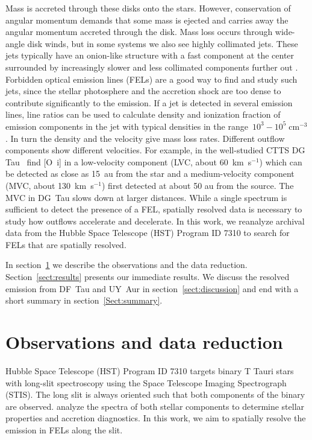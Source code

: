 \documentclass[twocolumn]{aastex62}
\begin{document}
Mass is accreted through these disks onto the stars. However,
conservation of angular momentum demands that some mass is ejected and
carries away the angular momentum accreted through
the disk. Mass
loss occurs through wide-angle disk winds, but in some systems we 
also see highly collimated jets. These jets typically have an onion-like
structure with a fast component at the center surrounded by increasingly
slower and less collimated components further
out \citep{2000ApJ...537L..49B}. Forbidden optical emission lines (FELs) are a
good way to find and study such jets, since the stellar photosphere and
the accretion shock are too dense to contribute significantly to the emission. If a
jet is detected in several emission lines, line ratios can be used to
calculate density and ionization fraction of emission components in the
jet with typical densities in the range~$10^3-10^5\;\mathrm{cm}^{-3}$
\citep[e.g.][]{1999A&A...342..717B,2000A&A...356L..41L,2013A&A...550L...1S}. In turn
the density and the velocity give mass loss rates. Different outflow
components show different velocities. For example, in the well-studied
CTTS DG Tau~\citet{2013A&A...550L...1S} find [O~{\sc i}] in a low-velocity
component (LVC, about 60~km~s$^{-1}$) which can be detected as
close as 15~au from the star and a medium-velocity component (MVC, about
130~km~s$^{-1}$) first detected at about 50 au from the source. The MVC in DG~Tau
slows down at larger distances. While a single spectrum is sufficient to
detect the presence of a FEL, spatially resolved data is necessary to study
how outflows accelerate and decelerate. In this work, we reanalyze
archival data from the Hubble Space Telescope (HST) Program ID 7310 to
search for FELs that are spatially resolved.

In section~\ref{sect:obs} we describe the observations and the data reduction. Section~\ref{sect:results} presents our immediate results. We discuss the resolved emission from DF~Tau and UY~Aur in section~\ref{sect:discussion} and end with a short summary in section~\ref{Sect:summary}.

\section{Observations and data reduction}
\label{sect:obs}



Hubble Space Telescope (HST) Program ID 7310 targets binary T Tauri
stars with long-slit spectroscopy using the Space Telescope Imaging
Spectrograph (STIS). The long slit is always oriented such that both
components of the binary are observed. \citet{2003ApJ...583..334H} analyze the
spectra of both stellar components to determine stellar properties and
accretion diagnostics. In this work, we aim to spatially resolve the
emission in FELs along the slit.
\end{document}
